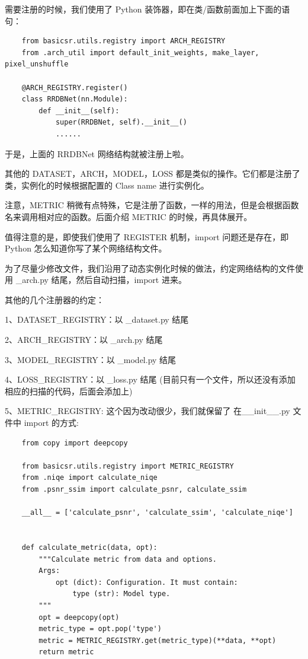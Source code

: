 \documentclass[../main.tex]{subfiles}
\begin{document}
    需要注册的时候，我们使用了 Python 装饰器，即在类/函数前面加上下面的语句：
    \begin{verbatim}
    from basicsr.utils.registry import ARCH_REGISTRY
    from .arch_util import default_init_weights, make_layer, pixel_unshuffle

    @ARCH_REGISTRY.register()
    class RRDBNet(nn.Module):
        def __init__(self):
            super(RRDBNet, self).__init__()
            ......
    \end{verbatim}

    于是，上面的 RRDBNet 网络结构就被注册上啦。

    其他的 DATASET，ARCH，MODEL，LOSS 都是类似的操作。它们都是注册了类，实例化的时候根据配置的 Class name 进行实例化。

    注意，METRIC 稍微有点特殊，它是注册了函数，一样的用法，但是会根据函数名来调用相对应的函数。后面介绍 METRIC 的时候，再具体展开。

    值得注意的是，即使我们使用了 REGISTER 机制，import 问题还是存在，即 Python 怎么知道你写了某个网络结构文件。

    为了尽量少修改文件，我们沿用了动态实例化时候的做法，约定网络结构的文件使用  \_arch.py 结尾，然后自动扫描，import 进来。

    其他的几个注册器的约定：

    1、DATASET\_REGISTRY：以 \_dataset.py 结尾

    2、ARCH\_REGISTRY：以 \_arch.py 结尾

    3、MODEL\_REGISTRY：以 \_model.py 结尾

    4、LOSS\_REGISTRY：以 \_loss.py 结尾 (目前只有一个文件，所以还没有添加相应的扫描的代码，后面会添加上)

    5、METRIC\_REGISTRY: 这个因为改动很少，我们就保留了 在\_\_init\_\_.py 文件中 import 的方式:
    \begin{verbatim}
    from copy import deepcopy

    from basicsr.utils.registry import METRIC_REGISTRY
    from .niqe import calculate_niqe
    from .psnr_ssim import calculate_psnr, calculate_ssim

    __all__ = ['calculate_psnr', 'calculate_ssim', 'calculate_niqe']


    def calculate_metric(data, opt):
        """Calculate metric from data and options.
        Args:
            opt (dict): Configuration. It must contain:
                type (str): Model type.
        """
        opt = deepcopy(opt)
        metric_type = opt.pop('type')
        metric = METRIC_REGISTRY.get(metric_type)(**data, **opt)
        return metric
    \end{verbatim}
\end{document}
